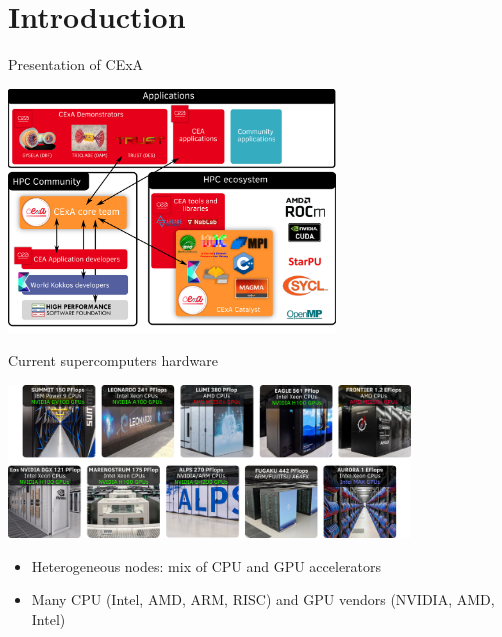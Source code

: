 \documentclass[aspectratio=169]{beamer}
\begin{document}

\section{Introduction}


\begin{frame}{Presentation of CExA}
    \begin{center}
        \includegraphics[width=0.65\textwidth]{cexa.png}
    \end{center}
\end{frame}


\begin{frame}{Current supercomputers hardware}
    \begin{center}
        \includegraphics[width=0.8\textwidth]{top10_super_computers.png}

        \caption{Top 10 supercomputers in the world in June 2024}
    \end{center}
    \begin{itemize}
        \item Heterogeneous nodes: mix of CPU and GPU accelerators
        \item Many CPU (Intel, AMD, ARM, RISC) and GPU vendors (NVIDIA, AMD, Intel)
    \end{itemize}
\end{frame}
\end{document}
